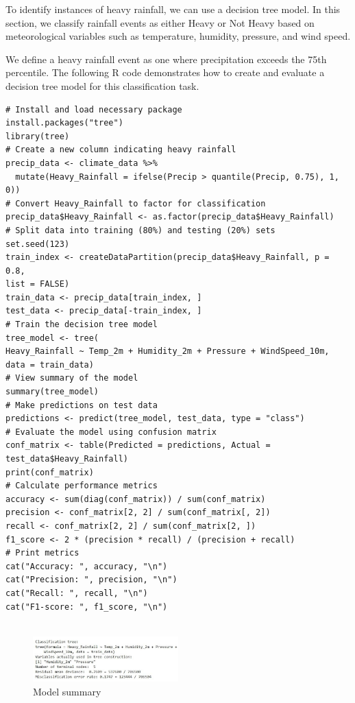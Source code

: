 To identify instances of heavy rainfall, we can use a decision tree model. In this section, we classify rainfall events as either Heavy or Not Heavy based on meteorological variables such as temperature, humidity, pressure, and wind speed.

We define a heavy rainfall event as one where precipitation exceeds the 75th percentile. The following R code demonstrates how to create and evaluate a decision tree model for this classification task.

\begin{verbatim}
# Install and load necessary package
install.packages("tree")
library(tree)
# Create a new column indicating heavy rainfall
precip_data <- climate_data %>%
  mutate(Heavy_Rainfall = ifelse(Precip > quantile(Precip, 0.75), 1, 0))
# Convert Heavy_Rainfall to factor for classification
precip_data$Heavy_Rainfall <- as.factor(precip_data$Heavy_Rainfall)
# Split data into training (80%) and testing (20%) sets
set.seed(123)
train_index <- createDataPartition(precip_data$Heavy_Rainfall, p = 0.8,
list = FALSE)
train_data <- precip_data[train_index, ]
test_data <- precip_data[-train_index, ]
# Train the decision tree model
tree_model <- tree(
Heavy_Rainfall ~ Temp_2m + Humidity_2m + Pressure + WindSpeed_10m, 
data = train_data)
# View summary of the model
summary(tree_model)
# Make predictions on test data
predictions <- predict(tree_model, test_data, type = "class")
# Evaluate the model using confusion matrix
conf_matrix <- table(Predicted = predictions, Actual = test_data$Heavy_Rainfall)
print(conf_matrix)
# Calculate performance metrics
accuracy <- sum(diag(conf_matrix)) / sum(conf_matrix)
precision <- conf_matrix[2, 2] / sum(conf_matrix[, 2])
recall <- conf_matrix[2, 2] / sum(conf_matrix[2, ])
f1_score <- 2 * (precision * recall) / (precision + recall)
# Print metrics
cat("Accuracy: ", accuracy, "\n")
cat("Precision: ", precision, "\n")
cat("Recall: ", recall, "\n")
cat("F1-score: ", f1_score, "\n")


\end{verbatim}

\begin{figure}[h]
\centering
\includegraphics[width=0.5\textwidth]{figures/tree_summ.jpg}
\caption{Model summary}
\end{figure}


